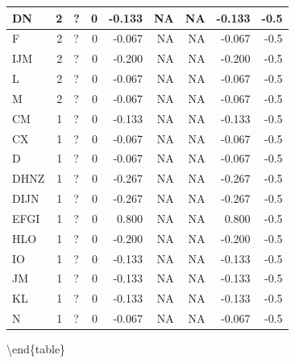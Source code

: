 \documentclass[
  letterpaper,
  DIV=11,
  numbers=noendperiod]{scrreprt}
\begin{document}
\begin{tabular}[t]{l|r|l|r|r|r|r|r|r}
\hline
\hspace{1em}DN & 2 & ? & 0 & -0.133 & NA & NA & -0.133 & -0.5\\
\hline
\hspace{1em}F & 2 & ? & 0 & -0.067 & NA & NA & -0.067 & -0.5\\
\hline
\hspace{1em}IJM & 2 & ? & 0 & -0.200 & NA & NA & -0.200 & -0.5\\
\hline
\hspace{1em}L & 2 & ? & 0 & -0.067 & NA & NA & -0.067 & -0.5\\
\hline
\hspace{1em}M & 2 & ? & 0 & -0.067 & NA & NA & -0.067 & -0.5\\
\hline
\hspace{1em}CM & 1 & ? & 0 & -0.133 & NA & NA & -0.133 & -0.5\\
\hline
\hspace{1em}CX & 1 & ? & 0 & -0.067 & NA & NA & -0.067 & -0.5\\
\hline
\hspace{1em}D & 1 & ? & 0 & -0.067 & NA & NA & -0.067 & -0.5\\
\hline
\hspace{1em}DHNZ & 1 & ? & 0 & -0.267 & NA & NA & -0.267 & -0.5\\
\hline
\hspace{1em}DIJN & 1 & ? & 0 & -0.267 & NA & NA & -0.267 & -0.5\\
\hline
\hspace{1em}EFGI & 1 & ? & 0 & 0.800 & NA & NA & 0.800 & -0.5\\
\hline
\hspace{1em}HLO & 1 & ? & 0 & -0.200 & NA & NA & -0.200 & -0.5\\
\hline
\hspace{1em}IO & 1 & ? & 0 & -0.133 & NA & NA & -0.133 & -0.5\\
\hline
\hspace{1em}JM & 1 & ? & 0 & -0.133 & NA & NA & -0.133 & -0.5\\
\hline
\hspace{1em}KL & 1 & ? & 0 & -0.133 & NA & NA & -0.133 & -0.5\\
\hline
\hspace{1em}N & 1 & ? & 0 & -0.067 & NA & NA & -0.067 & -0.5\\
\hline
\end{tabular}

\textbackslash end\{table\}
\end{document}

